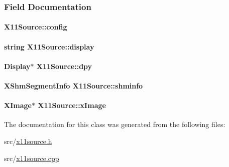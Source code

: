 \subsubsection{\-Field \-Documentation}
\hypertarget{classX11Source_a0bb66f8a67eaf9fd1a9c7cd457744e6a}{
\paragraph[{config}]{ {\bf \-X11\-Source\-::config}}}\label{classX11Source_a0bb66f8a67eaf9fd1a9c7cd457744e6a}
\hypertarget{classX11Source_aca767875225424e06a91240ce66878fd}{
\paragraph[{display}]{\setlength{\rightskip}{0pt plus 5cm}string {\bf \-X11\-Source\-::display}}}\label{classX11Source_aca767875225424e06a91240ce66878fd}
\hypertarget{classX11Source_ab29ca4f07bd4d6e512d900268b9ae6e4}{
\paragraph[{dpy}]{\setlength{\rightskip}{0pt plus 5cm}\-Display$\ast$ {\bf \-X11\-Source\-::dpy}}}\label{classX11Source_ab29ca4f07bd4d6e512d900268b9ae6e4}
\hypertarget{classX11Source_a77384d75a89d1fdd0cb3f20f61453f46}{
\paragraph[{shminfo}]{\setlength{\rightskip}{0pt plus 5cm}\-X\-Shm\-Segment\-Info {\bf \-X11\-Source\-::shminfo}}}\label{classX11Source_a77384d75a89d1fdd0cb3f20f61453f46}
\hypertarget{classX11Source_a88bec28d12299ca93f4516a1e6ce7cff}{
\paragraph[{x\-Image}]{\setlength{\rightskip}{0pt plus 5cm}\-X\-Image$\ast$ {\bf \-X11\-Source\-::x\-Image}}}\label{classX11Source_a88bec28d12299ca93f4516a1e6ce7cff}


\-The documentation for this class was generated from the following files\-:\begin{DoxyCompactItemize}
\item 
src/\hyperlink{x11source_8h}{x11source.\-h}\item 
src/\hyperlink{x11source_8cpp}{x11source.\-cpp}\end{DoxyCompactItemize}

